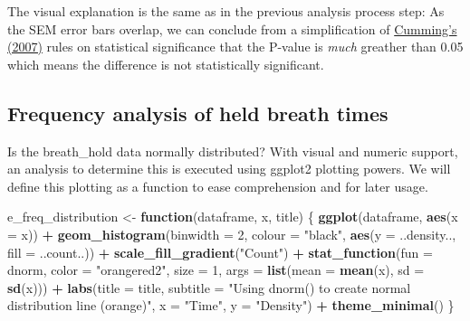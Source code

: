 \documentclass[]{article}
\newenvironment{Shaded}{\begin{snugshade}}{\end{snugshade}}
\newcommand{\ControlFlowTok}[1]{\textcolor[rgb]{0.13,0.29,0.53}{\textbf{#1}}}
\newcommand{\DataTypeTok}[1]{\textcolor[rgb]{0.13,0.29,0.53}{#1}}
\newcommand{\DecValTok}[1]{\textcolor[rgb]{0.00,0.00,0.81}{#1}}
\newcommand{\KeywordTok}[1]{\textcolor[rgb]{0.13,0.29,0.53}{\textbf{#1}}}
\newcommand{\NormalTok}[1]{#1}
\newcommand{\OperatorTok}[1]{\textcolor[rgb]{0.81,0.36,0.00}{\textbf{#1}}}
\newcommand{\StringTok}[1]{\textcolor[rgb]{0.31,0.60,0.02}{#1}}
\begin{document}
The visual explanation is the same as in the previous analysis process step: As the SEM error bars overlap, we can conclude from a simplification of \href{https://www.graphpad.com/support/faq/spanwhat-you-can-conclude-when-two-error-bars-overlap-or-dontspan/}{Cumming's (2007)} rules on statistical significance that the P-value is \emph{much} greather than 0.05 which means the difference is not statistically significant.

\hypertarget{frequency-analysis-of-held-breath-times}{%
\subsection{Frequency analysis of held breath times}\label{frequency-analysis-of-held-breath-times}}

Is the breath\_hold data normally distributed? With visual and numeric support, an analysis to determine this is executed using ggplot2 plotting powers. We will define this plotting as a function to ease comprehension and for later usage.

\begin{Shaded}
\begin{Highlighting}[]
\NormalTok{e_freq_distribution <-}\StringTok{ }\ControlFlowTok{function}\NormalTok{(dataframe, x, title) \{}
    \KeywordTok{ggplot}\NormalTok{(dataframe, }\KeywordTok{aes}\NormalTok{(}\DataTypeTok{x =}\NormalTok{ x)) }\OperatorTok{+}\StringTok{ }\KeywordTok{geom_histogram}\NormalTok{(}\DataTypeTok{binwidth =} \DecValTok{2}\NormalTok{, }\DataTypeTok{colour =} \StringTok{"black"}\NormalTok{, }
        \KeywordTok{aes}\NormalTok{(}\DataTypeTok{y =}\NormalTok{ ..density.., }\DataTypeTok{fill =}\NormalTok{ ..count..)) }\OperatorTok{+}\StringTok{ }\KeywordTok{scale_fill_gradient}\NormalTok{(}\StringTok{"Count"}\NormalTok{) }\OperatorTok{+}\StringTok{ }
\StringTok{        }\KeywordTok{stat_function}\NormalTok{(}\DataTypeTok{fun =}\NormalTok{ dnorm, }\DataTypeTok{color =} \StringTok{"orangered2"}\NormalTok{, }\DataTypeTok{size =} \DecValTok{1}\NormalTok{, }\DataTypeTok{args =} \KeywordTok{list}\NormalTok{(}\DataTypeTok{mean =} \KeywordTok{mean}\NormalTok{(x), }
            \DataTypeTok{sd =} \KeywordTok{sd}\NormalTok{(x))) }\OperatorTok{+}\StringTok{ }\KeywordTok{labs}\NormalTok{(}\DataTypeTok{title =}\NormalTok{ title, }\DataTypeTok{subtitle =} \StringTok{"Using dnorm() to create normal distribution line (orange)"}\NormalTok{, }
        \DataTypeTok{x =} \StringTok{"Time"}\NormalTok{, }\DataTypeTok{y =} \StringTok{"Density"}\NormalTok{) }\OperatorTok{+}\StringTok{ }\KeywordTok{theme_minimal}\NormalTok{()}
\NormalTok{\}}
\end{Highlighting}
\end{Shaded}
\end{document}
